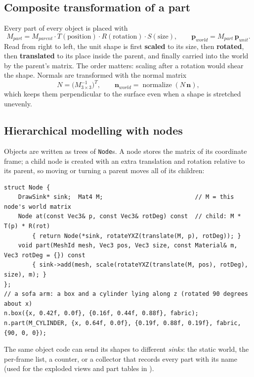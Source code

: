 \subsection{Composite transformation of a part}
Every part of every object is placed with
\[
M_{part} = M_{parent}\cdot T(\text{position})\cdot R(\text{rotation})\cdot S(\text{size}),\qquad
\mathbf{p}_{world} = M_{part}\,\mathbf{p}_{unit}.
\]
Read from right to left, the unit shape is first \textbf{scaled} to its size, then \textbf{rotated}, then
\textbf{translated} to its place inside the parent, and finally carried into the world by the parent's
matrix. The order matters: scaling after a rotation would shear the shape. Normals are transformed with
the normal matrix
\[
N = \big(M_{3\times3}^{-1}\big)^T,\qquad \mathbf{n}_{world} = \operatorname{normalize}(N\,\mathbf{n}),
\]
which keeps them perpendicular to the surface even when a shape is stretched unevenly.

\subsection{Hierarchical modelling with nodes}
Objects are written as trees of \texttt{Node}s. A node stores the matrix of its coordinate frame; a child
node is created with an extra translation and rotation relative to its parent, so moving or turning a
parent moves all of its children:
\begin{lstlisting}
struct Node {
    DrawSink* sink;  Mat4 M;                          // M = this node's world matrix
    Node at(const Vec3& p, const Vec3& rotDeg) const  // child: M * T(p) * R(rot)
        { return Node(*sink, rotateYXZ(translate(M, p), rotDeg)); }
    void part(MeshId mesh, Vec3 pos, Vec3 size, const Material& m, Vec3 rotDeg = {}) const
        { sink->add(mesh, scale(rotateYXZ(translate(M, pos), rotDeg), size), m); }
};
// a sofa arm: a box and a cylinder lying along z (rotated 90 degrees about x)
n.box({x, 0.42f, 0.0f}, {0.16f, 0.44f, 0.88f}, fabric);
n.part(M_CYLINDER, {x, 0.64f, 0.0f}, {0.19f, 0.88f, 0.19f}, fabric, {90, 0, 0});
\end{lstlisting}
The same object code can send its shapes to different \emph{sinks}: the static world, the per-frame list,
a counter, or a collector that records every part with its name (used for the exploded views and part
tables in ).

